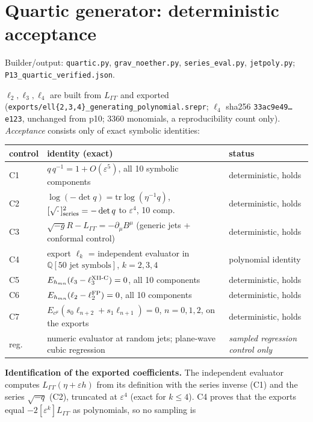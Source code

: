 \section{Quartic generator: deterministic acceptance}
\noindent Builder/output: \texttt{quartic.py}, \texttt{grav\_noether.py}, \texttt{series\_eval.py}, \texttt{jetpoly.py};
\texttt{P13\_quartic\_verified.json}.\par\smallskip
$\ell_2,\ell_3,\ell_4$ are built from $L_{\Gamma\Gamma}$ and exported
(\texttt{exports/ell\{2,3,4\}\_generating\_polynomial.srepr}; $\ell_4$ sha256 \texttt{33ac9e49\ldots e123}, unchanged
from p10; 3360 monomials, a reproducibility count only). \emph{Acceptance} consists only of exact symbolic identities:
\begin{center}\footnotesize
\begin{tabular}{lll}
\toprule
control & identity (exact) & status\\
\midrule
C1 & $q\,q^{-1}=1+O(\varepsilon^5)$, all 10 symbolic components & deterministic, holds\\
C2 & $\log(-\det q)=\mathrm{tr}\log(\eta^{-1}q)$, $[\sqrt{\cdot}\,]^2_{\rm series}=-\det q$ to $\varepsilon^4$, 10 comp. & deterministic, holds\\
C3 & $\sqrt{-g}R-L_{\Gamma\Gamma}=-\partial_\mu B^\mu$ (generic jets + conformal control) & deterministic, holds\\
C4 & export $\ell_k$ = independent evaluator in $\mathbb Q[50\text{ jet symbols}]$, $k=2,3,4$ & polynomial identity\\
C5 & $E_{h_{mn}}(\ell_3-\ell_3^{\rm XII\text{-}C})=0$, all 10 components & deterministic, holds\\
C6 & $E_{h_{mn}}(\ell_2-\ell_2^{\rm FP})=0$, all 10 components & deterministic, holds\\
C7 & $E_{c^\mu}(s_0\ell_{n+2}+s_1\ell_{n+1})=0$, $n=0,1,2$, on the exports & deterministic, holds\\
\midrule
reg. & numeric evaluator at random jets; plane-wave cubic regression & \emph{sampled regression control only}\\
\bottomrule
\end{tabular}
\end{center}
\textbf{Identification of the exported coefficients.} The independent evaluator computes $L_{\Gamma\Gamma}(\eta+\varepsilon h)$
from its definition with the series inverse (C1) and the series $\sqrt{-q}$ (C2), truncated at $\varepsilon^4$ (exact
for $k\le4$). C4 proves that the exports equal $-2[\varepsilon^k]L_{\Gamma\Gamma}$ as polynomials, so no sampling is
